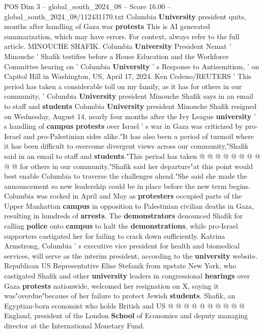 \begin{textsample}{POS Dim 3 – global\_south\_2024\_08 – Score 16.00 – global\_south\_2024\_08/112431170.txt}  \label{ex:f3_pos_332}
Columbia \textbf{University} president quits, months after handling of Gaza war \textbf{protests} This is AI generated summarization, which may have errors.
For context, always refer to the full article.
MINOUCHE SHAFIK.
Columbia \textbf{University} President Nemat ' Minouche ' Shafik testifies before a House Education and the Workforce Committee hearing on ' Columbia \textbf{University} ' s Response to Antisemitism, ' on Capitol Hill in Washington, US, April 17, 2024.
Ken Cedeno/REUTERS ' This period has taken a considerable toll on my family, as it has for others in our community, ' Columbia \textbf{University} president Minouche Shafik says in an email to staff and \textbf{students} Columbia \textbf{University} president Minouche Shafik resigned on Wednesday, August 14, nearly four months after the Ivy League \textbf{university} ' s handling of \textbf{campus} \textbf{protests} over Israel ' s war in Gaza was criticized by pro-Israel and pro-Palestinian sides alike."It has also been a period of turmoil where it has been difficult to overcome divergent views across our community,"Shafik said in an email to staff and \textbf{students}."This period has taken @ @ @ @ @ @ @ @ @ @ for others in our community."Shafik said her departure"at this point would best enable Columbia to traverse the challenges ahead."She said she made the announcement so new leadership could be in place before the new term begins.
Columbia was rocked in April and May as \textbf{protesters} occupied parts of the Upper Manhattan \textbf{campus} in opposition to Palestinian civilian deaths in Gaza, resulting in hundreds of \textbf{arrests}.
The \textbf{demonstrators} denounced Shafik for calling \textbf{police} onto \textbf{campus} to halt the \textbf{demonstrations}, while pro-Israel supporters castigated her for failing to crack down sufficiently.
Katrina Armstrong, Columbia ' s executive vice president for health and biomedical services, will serve as the interim president, according to the \textbf{university} website.
Republican US Representative Elise Stefanik from upstate New York, who castigated Shafik and other \textbf{university} leaders in congressional \textbf{hearings} over Gaza \textbf{protests} nationwide, welcomed her resignation on X, saying it was"overdue"because of her failure to protect Jewish \textbf{students}.
Shafik, an Egyptian-born economist who holds British and US @ @ @ @ @ @ @ @ @ @ England, president of the London \textbf{School} of Economics and deputy managing director at the International Monetary Fund.

\end{textsample}
